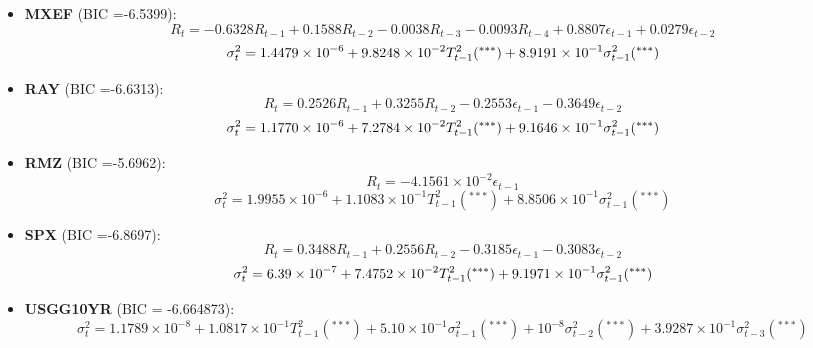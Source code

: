 \documentclass[12pt]{article}
\begin{document}
\begin{itemize}
\item \textbf{MXEF} (BIC =-6.5399):
\begin{dmath*}
R_t = -0.6328R_{t-1}+  0.1588R_{t-2} -0.0038R_{t-3}  -0.0093R_{t-4} +
 0.8807\epsilon_{t-1} +  0.0279 \epsilon_{t-2} 
\end{dmath*}
\begin{dmath*}
\sigma_t^2  = 1.4479\times 10^{-6} + 9.8248\times 10^{-2} T_{t-1}^2(^{***}) +8.9191\times 10^{-1}  \sigma_{t-1}^2(^{***}) \\
\end{dmath*}


\item \textbf{RAY} (BIC =-6.6313):
\begin{dmath*}
R_t = 0.2526R_{t-1}+  0.3255R_{t-2} -0.2553\epsilon_{t-1} -0.3649 \epsilon_{t-2} 
\end{dmath*}
\begin{dmath*}
\sigma_t^2  = 1.1770\times 10^{-6} + 7.2784\times 10^{-2} T_{t-1}^2(^{***}) +9.1646\times 10^{-1}  \sigma_{t-1}^2(^{***}) \\
\end{dmath*}


\item \textbf{RMZ} (BIC =-5.6962):
\begin{dmath*}
R_t = -4.1561\times 10^{-2}\epsilon_{t-1} 
\end{dmath*}
\begin{dmath*}
\sigma_t^2  = 1.9955 \times 10^{-6} +1.1083\times 10^{-1} T_{t-1}^2(^{***})  +8.8506\times 10^{-1}  \sigma_{t-1}^2(^{***}) 
\end{dmath*}

\item \textbf{SPX} (BIC =-6.8697):
\begin{dmath*}
R_t =  0.3488R_{t-1}+  0.2556R_{t-2}  -0.3185\epsilon_{t-1}  -0.3083\epsilon_{t-2} 
\end{dmath*}
\begin{dmath*}
\sigma_t^2  = 6.39\times 10^{-7} + 7.4752\times 10^{-2} T_{t-1}^2(^{***}) +9.1971\times 10^{-1}  \sigma_{t-1}^2(^{***}) \\
\end{dmath*}


\item \textbf{USGG10YR} (BIC = -6.664873):
\begin{dmath*}
\sigma_t^2  = 1.1789 \times 10^{-8} +1.0817\times 10^{-1} T_{t-1}^2 (^{***}) +5.10\times 10^{-1}  \sigma_{t-1}^2(^{***}) 
+10^{-8}  \sigma_{t-2}^2(^{***}) 
+3.9287\times 10^{-1}  \sigma_{t-3}^2(^{***}) 
\end{dmath*}
\end{itemize}


\end{document}
